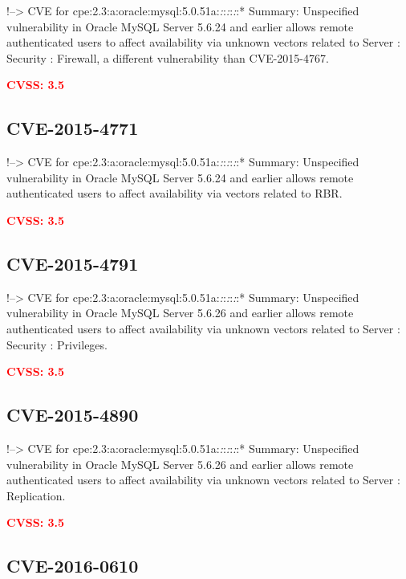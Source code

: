\documentclass[a4paper, 12pt]{article}
\begin{document}
!--\textgreater{} CVE for
cpe:2.3:a:oracle:mysql:5.0.51a:\emph{:}:\emph{:}:\emph{:}:* Summary:
Unspecified vulnerability in Oracle MySQL Server 5.6.24 and earlier
allows remote authenticated users to affect availability via unknown
vectors related to Server : Security : Firewall, a different
vulnerability than CVE-2015-4767.

\textbf{\textcolor{red}{CVSS: 3.5}}

\hypertarget{cve-2015-4771}{%
\subsection{CVE-2015-4771}\label{cve-2015-4771}}

!--\textgreater{} CVE for
cpe:2.3:a:oracle:mysql:5.0.51a:\emph{:}:\emph{:}:\emph{:}:* Summary:
Unspecified vulnerability in Oracle MySQL Server 5.6.24 and earlier
allows remote authenticated users to affect availability via vectors
related to RBR.

\textbf{\textcolor{red}{CVSS: 3.5}}

\hypertarget{cve-2015-4791}{%
\subsection{CVE-2015-4791}\label{cve-2015-4791}}

!--\textgreater{} CVE for
cpe:2.3:a:oracle:mysql:5.0.51a:\emph{:}:\emph{:}:\emph{:}:* Summary:
Unspecified vulnerability in Oracle MySQL Server 5.6.26 and earlier
allows remote authenticated users to affect availability via unknown
vectors related to Server : Security : Privileges.

\textbf{\textcolor{red}{CVSS: 3.5}}

\hypertarget{cve-2015-4890}{%
\subsection{CVE-2015-4890}\label{cve-2015-4890}}

!--\textgreater{} CVE for
cpe:2.3:a:oracle:mysql:5.0.51a:\emph{:}:\emph{:}:\emph{:}:* Summary:
Unspecified vulnerability in Oracle MySQL Server 5.6.26 and earlier
allows remote authenticated users to affect availability via unknown
vectors related to Server : Replication.

\textbf{\textcolor{red}{CVSS: 3.5}}

\hypertarget{cve-2016-0610}{%
\subsection{CVE-2016-0610}\label{cve-2016-0610}}
\end{document}
